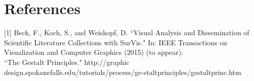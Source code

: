 \documentclass[12pt, twocolumn]{article}
\begin{document}
\section{References}
[1] Beck, F., Koch, S., and Weiskopf, D. ``Visual Analysis and Dissemination of Scientific Literature Collections with SurVis." In: IEEE Transactions on Visualization and Computer Graphics (2015) (to appear).
\\

\noindent
[2] ``The Gestalt Principles." http://graphic design.spokanefalls.edu/tutorials/process/ge-staltprinciples/gestaltprinc.htm\\
\end{document}
